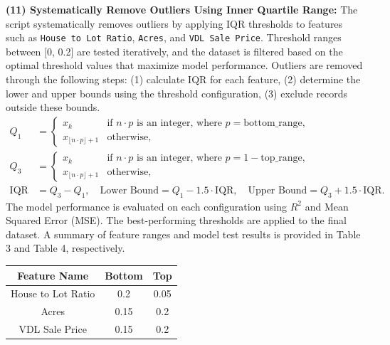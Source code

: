 \textbf{(11) Systematically Remove Outliers Using Inner Quartile Range:} The
script systematically removes outliers by applying IQR thresholds to features
such as \texttt{House to Lot Ratio}, \texttt{Acres}, and \texttt{VDL Sale Price}.
Threshold ranges between [0, 0.2] are tested iteratively, and the dataset is
filtered based on the optimal threshold values that maximize model performance. Outliers
are removed through the following steps: (1) calculate IQR for each feature, (2)
determine the lower and upper bounds using the threshold configuration, (3)
exclude records outside these bounds.
\[
	\begin{aligned}
		Q_{1}      & = \begin{cases}x_{k}&\text{if }n \cdot p \text{ is an integer, where }p = \text{bottom\_range}, \\ x_{\lfloor n \cdot p \rfloor + 1}&\text{otherwise},\end{cases}  \\
		Q_{3}      & = \begin{cases}x_{k}&\text{if }n \cdot p \text{ is an integer, where }p = 1 - \text{top\_range}, \\ x_{\lfloor n \cdot p \rfloor + 1}&\text{otherwise},\end{cases} \\
		\text{IQR} & = Q_{3}- Q_{1}, \quad \text{Lower Bound}= Q_{1}- 1.5 \cdot \text{IQR}, \quad \text{Upper Bound}= Q_{3}+ 1.5 \cdot \text{IQR}.
	\end{aligned}
\]
The model performance is evaluated on each configuration using $R^{2}$ and Mean Squared
Error (MSE). The best-performing thresholds are applied to the final dataset. A summary
of feature ranges and model test results is provided in Table 3 and Table 4,
respectively.
\begin{minipage}[t]{0.48\textwidth}
	\centering
	\renewcommand{\arraystretch}{1} %
	\begin{tabular}{|c|c|c|}
		\hline
		\textbf{Feature Name} & \textbf{Bottom} & \textbf{Top} \\
		\hline
		House to Lot Ratio    & 0.2             & 0.05         \\
		\hline
		Acres                 & 0.15            & 0.2          \\
		\hline
		VDL Sale Price        & 0.15            & 0.2          \\
		\hline
	\end{tabular}
\end{minipage}%
